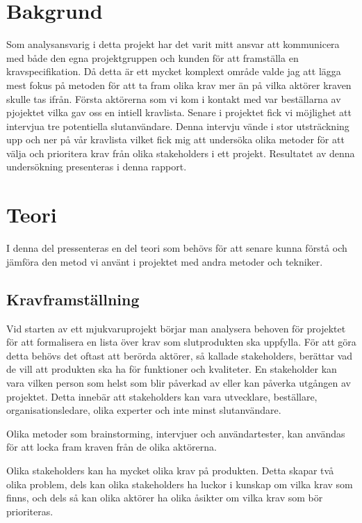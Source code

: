\section{Bakgrund}
Som analysansvarig i detta projekt har det varit mitt ansvar att kommunicera med både den egna projektgruppen och kunden för att framställa en kravspecifikation. Då detta är ett mycket komplext område valde jag att lägga mest fokus på metoden för att ta fram olika krav mer än på vilka aktörer kraven skulle tas ifrån. Första aktörerna som vi kom i kontakt med var beställarna av pjojektet vilka gav oss en intiell kravlista. Senare i projektet fick vi möjlighet att intervjua tre potentiella slutanvändare. Denna intervju vände i stor utsträckning upp och ner på vår kravlista vilket fick mig att undersöka olika metoder för att välja och prioritera krav från olika stakeholders i ett projekt. Resultatet av denna undersökning presenteras i denna rapport.  

\section{Teori}
I denna del pressenteras en del teori som behövs för att senare kunna förstå och jämföra den metod vi använt i projektet med andra metoder och tekniker.

\subsection{Kravframställning}
Vid starten av ett mjukvaruprojekt börjar man analysera behoven för projektet för att formalisera en lista över krav som slutprodukten ska uppfylla. För att göra detta behövs det oftast att berörda aktörer, så kallade stakeholders, berättar vad de vill att produkten ska ha för funktioner och kvaliteter. En stakeholder kan vara vilken person som helst som blir påverkad av eller kan påverka utgången av projektet. Detta innebär att stakeholders kan vara  utvecklare, beställare, organisationsledare, olika experter och inte minst slutanvändare. 

Olika metoder som brainstorming, intervjuer och användartester, kan användas för att locka fram kraven från de olika aktörerna.

Olika stakeholders kan ha mycket olika krav på produkten. Detta skapar två olika problem, dels kan olika stakeholders ha luckor i kunskap om vilka krav som finns, och dels så kan olika aktörer ha olika åsikter om vilka krav som bör prioriteras. 

